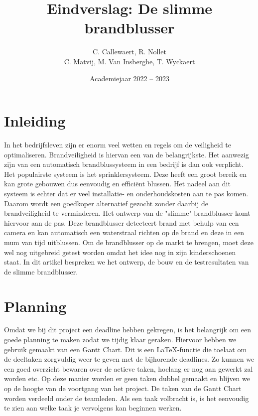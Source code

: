 \documentclass{kulakarticle}
\title{Eindverslag: De slimme brandblusser}
\author{C. Callewaert, R. Nollet \\
	 C. Matvij, M. Van Insberghe, T. Wyckaert }
\date{Academiejaar 2022 -- 2023}
\begin{document}
	
\maketitle

\tableofcontents
	
\section*{Inleiding}

In het bedrijfsleven zijn er enorm veel wetten en regels om de veiligheid te optimaliseren. Brandveiligheid is hiervan een van de belangrijkste. Het aanwezig zijn van een automatisch brandblussysteem in een bedrijf is dan ook verplicht. Het populairste systeem is het sprinklersysteem. Deze heeft een groot bereik en kan grote gebouwen dus eenvoudig en efficiënt blussen. Het nadeel aan dit systeem is echter dat er veel installatie- en onderhoudskosten aan te pas komen. Daarom wordt een goedkoper alternatief gezocht zonder daarbij de brandveiligheid te verminderen. Het ontwerp van de "slimme" brandblusser komt hiervoor aan de pas. Deze brandblusser detecteert brand met behulp van een camera en kan automatisch een waterstraal richten op de brand en deze in een mum van tijd uitblussen. Om  de brandblusser op de markt te brengen, moet deze wel nog uitgebreid getest worden omdat het idee nog in zijn kinderschoenen staat. In dit artikel bespreken we het ontwerp, de bouw en de testresultaten van de slimme brandblusser. 

\section{Planning}

Omdat we bij dit project een deadline hebben gekregen, is het belangrijk om een goede planning te maken zodat we tijdig klaar geraken. Hiervoor hebben we gebruik gemaakt van een Gantt Chart. Dit is een \LaTeX-functie die toelaat om de deeltaken zorgvuldig weer te geven met de bijhorende deadlines. Zo kunnen we een goed overzicht bewaren over de actieve taken, hoelang er nog aan gewerkt zal worden etc. Op deze manier worden er geen taken dubbel gemaakt en blijven we op de hoogte van de voortgang van het project.  De taken van de Gantt Chart worden verdeeld onder de teamleden. Als een taak volbracht is, is het eenvoudig  te zien aan welke taak je vervolgens kan beginnen werken.
\end{document}
